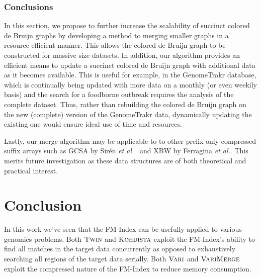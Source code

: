 \subsection{Conclusions}


In this section, we propose to further increase the scalability of succinct colored de Bruijn graphs by developing a method to merging smaller graphs in a resource-efficient manner.  This allows the colored de Bruijn graph to be constructed for massive size datasets.  In addition, our algorithm provides an efficient means to update a succinct colored de Bruijn graph with additional data  as it becomes available. This is useful for example, in the GenomeTrakr database, which is continually being updated with more data on a monthly (or even weekily basis) and the search for a foodborne outbreak requires the analysis of the complete dataset.  Thus, rather than rebuilding the colored de Bruijn graph on the new (complete) version of the GenomeTrakr data, dynamically updating the existing one  would ensure ideal use of time and resources.

Lastly, our merge algorithm may be applicable to  to other prefix-only compressed suffix arrays such as GCSA by Sir{\'e}n {\it et al.}~\cite{siren2014indexing} and XBW by Ferragina {\it et al.}\cite{ferragina2009compressing}.  This merits future investigation as these data structures are of both theoretical and practical interest.

























\chapter{Conclusion}
\bigskip

In this work we've seen that the FM-Index can be usefully applied to various genomics problems.  Both $\mbox{\rm \textsc{Twin}}$ and $\mbox{\rm \textsc{Kohdista}}$ exploit the FM-Index's ability to find all matches in the target data concurrently as opposed to exhaustively searching all regions of the target data serially.  Both $\mbox{\rm {\sc Vari}}$ and $\mbox{\rm {\sc VariMerge}}$ exploit the compressed nature of the FM-Index to reduce memory consumption.  

